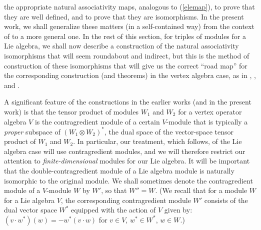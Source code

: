 \documentclass[12pt]{article}
\begin{document}
\begin{rema}
{the appropriate natural associativity maps, analogous to
(\ref{elemap}), to prove that they are well defined, and to prove that
they are isomorphisms.  In the present work, we shall generalize these
matters (in a self-contained way) {}from the context of \cite{tensor4}
to a more general one.  In the rest of this section, for triples of
modules for a Lie algebra, we shall now describe a construction of the
natural associativity isomorphisms that will seem roundabout and
indirect, but this is the method of construction of these isomorphisms
that will give us the correct ``road map'' for the corresponding
construction (and theorems) in the vertex algebra case, as in
\cite{tensor1}, \cite{tensor2}, \cite{tensor3} and \cite{tensor4}.}
\end{rema}

A significant feature of the constructions in the earlier works (and
in the present work) is that the tensor product of modules $W_1$ and
$W_2$ for a vertex operator algebra $V$ is the contragredient module
of a certain $V$-module that is typically a {\it proper} subspace of
$(W_1\otimes W_2)^*$, the dual space of the vector-space tensor
product of $W_1$ and $W_2$.  In particular, our treatment, which
follows, of the Lie algebra case will use contragredient modules, and
we will therefore restrict our attention to {\it finite-dimensional}
modules for our Lie algebra.  It will be important that the
double-contragredient module of a Lie algebra module is naturally
isomorphic to the original module.  We shall sometimes denote the
contragredient module of a $V$-module $W$ by $W'$, so that $W''=W$.
(We recall that for a module $W$ for a Lie algebra $V$, the
corresponding contragredient module $W'$ consists of the dual vector
space $W^*$ equipped with the action of $V$ given by: $(v \cdot
w^*)(w) = - w^*(v \cdot w)$ for $v \in V$, $w^* \in W^*$, $w \in W$.)
\end{document}
